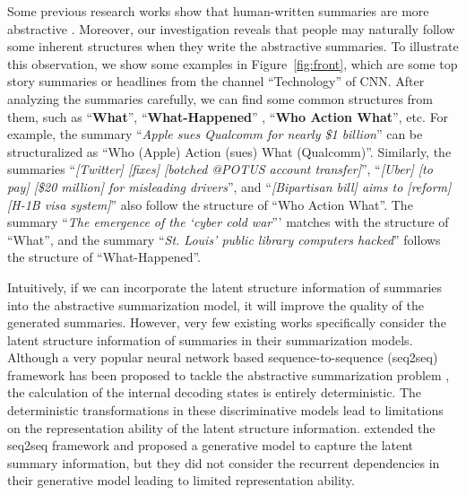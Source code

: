 \documentclass[11pt,letterpaper]{article}
\begin{document}
Some previous research works show that human-written summaries are more abstractive \cite{jing2000cut}.
Moreover, our investigation reveals that people may naturally follow some inherent structures when they write the abstractive summaries.
To illustrate this observation, we show some examples in Figure~\ref{fig:front}, which are some top story summaries or headlines from the channel ``Technology'' of CNN. After analyzing the summaries carefully, we can find some common structures from them, such as ``\textbf{What}'', ``\textbf{What-Happened}'' , ``\textbf{Who Action What}'', etc.
For example, the summary ``\textit{Apple sues Qualcomm for nearly \$1 billion}'' can be  structuralized as ``Who (Apple) Action (sues) What (Qualcomm)''.
Similarly, the summaries ``\textit{[Twitter] [fixes] [botched @POTUS account transfer]}'',  ``\textit{[Uber] [to pay] [\$20 million] for misleading drivers}'', and ``\textit{[Bipartisan bill] aims to [reform] [H-1B visa system]}'' also follow the structure of ``Who Action What''.
The summary ``\textit{The emergence of the `cyber cold war}''' matches with the structure of ``What'', and the summary ``\textit{St. Louis' public library computers hacked}'' follows the structure of ``What-Happened''.


Intuitively, if we can incorporate the latent structure information of summaries into the abstractive summarization model, it will improve the quality of the generated summaries.
However, very few existing works specifically consider the latent structure information of summaries in their summarization models.
Although a very popular neural network based sequence-to-sequence (seq2seq) framework has been proposed to tackle the abstractive summarization problem \cite{lopyrev2015generating,rush2015neural,nallapati2016abstractive}, the calculation of the internal decoding states is entirely deterministic.
The deterministic transformations in these discriminative models lead to limitations on the representation ability of the latent structure information.
\citet{miao2016language} extended the seq2seq framework and proposed a generative model to capture the latent summary information, but they did not consider the recurrent dependencies in their generative model leading to limited representation ability.
\end{document}
